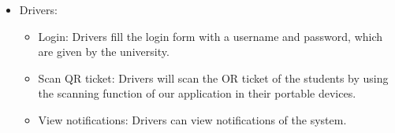 \begin{itemize}
\begin{itemize}
\begin{itemize}
                \end{itemize}
        \end{itemize}
    \item Drivers:
        \begin{itemize}
            \item Login: Drivers fill the login form with a username and password, which are given by the university.
            \item Scan QR ticket: Drivers will scan the OR ticket of the students by using the scanning function of our application in their portable devices.
            \item View notifications: Drivers can view notifications of the system.
        \end{itemize}
\end{itemize}

